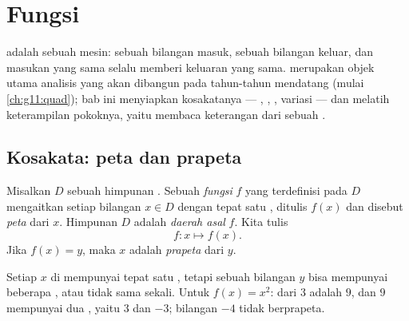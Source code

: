 \chapter{Fungsi}\label{ch:g10:functions}

 adalah sebuah mesin: sebuah bilangan masuk, sebuah bilangan keluar,
dan masukan yang sama selalu memberi keluaran yang sama.  merupakan
objek utama analisis yang akan dibangun pada tahun-tahun mendatang
(mulai \cref{ch:g11:quad}); bab ini menyiapkan kosakatanya ---
, , , variasi --- dan melatih keterampilan pokoknya,
yaitu membaca keterangan dari sebuah .

\section{Kosakata: peta dan prapeta}

\begin{definition}[Fungsi]\label{def:g10:functions:function}
Misalkan $D$ sebuah himpunan . Sebuah \emph{fungsi}
$f$ yang terdefinisi pada $D$ mengaitkan setiap bilangan $x \in D$ dengan
tepat satu , ditulis $f(x)$ dan disebut \emph{peta}
dari $x$. Himpunan $D$ adalah \emph{daerah asal} $f$.
Kita tulis
\[
f : x \longmapsto f(x).
\]
Jika $f(x) = y$, maka $x$ adalah \emph{prapeta} dari $y$.
\end{definition}

\begin{remark}
Setiap $x$ di  mempunyai tepat satu , tetapi sebuah bilangan
$y$ bisa mempunyai beberapa , atau tidak sama sekali. Untuk
$f(x) = x^2$:  dari $3$ adalah $9$, dan
$9$ mempunyai dua , yaitu $3$ dan $-3$; bilangan $-4$ tidak berprapeta.
\end{remark}

